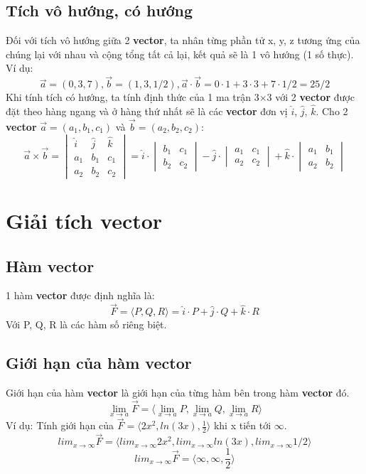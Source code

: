 \documentclass{article}
\begin{document}
\subsection{Tích vô hướng, có hướng}
Đối với tích vô hướng giữa 2 \textbf{vector}, ta nhân từng phần tử x, y, z tương ứng của chúng lại với nhau và cộng tổng tất cả lại, kết quả sẽ là 1 vô hướng (1 số thực).\newline
Ví dụ: 
\[\vec{a}=(0,3,7), \vec{b}=(1,3, 1/2),\vec{a}\cdot\vec{b}=0\cdot1+3\cdot3+7\cdot1/2=25/2\]
Khi tính tích có hướng, ta tính định thức của 1 ma trận 3$\times$3 với 2 \textbf{vector} được đặt theo hàng ngang và ở hàng thứ nhất sẽ là các \textbf{vector} đơn vị $\hat{i}$, $\hat{j}$, $\hat{k}$.
Cho 2 \textbf{vector} $\vec{a}=(a_1, b_1, c_1)$ và $\vec{b}=(a_2, b_2, c_2)$: 
\[\vec{a}\times\vec{b}= \begin{vmatrix}
    \hat{i}&\hat{j}&\hat{k}\\
    a_1&b_1&c_1\\
    a_2&b_2&c_2
\end{vmatrix}=\hat{i}\cdot\begin{vmatrix}
    b_1&c_1\\
    b_2&c_2
\end{vmatrix}-\hat{j}\cdot\begin{vmatrix}
    a_1&c_1\\
    a_2&c_2
\end{vmatrix}+\hat{k}\cdot\begin{vmatrix}
    a_1&b_1\\
    a_2&b_2
\end{vmatrix}\]

\section{Giải tích vector}
\subsection{Hàm vector}
1 hàm \textbf{vector} được định nghĩa là: 
\[\vec{F} = \langle P, Q, R \rangle=\hat{i}\cdot P+\hat{j}\cdot Q+\hat{k}\cdot R\]
Với P, Q, R là các hàm số riêng biệt.

\subsection{Giới hạn của hàm vector}
Giới hạn của hàm \textbf{vector} là giới hạn của từng hàm bên trong hàm \textbf{vector} đó.
\[\lim_{x \to a}\vec{F}= \langle \lim_{x \to a}P, \lim_{x \to a}Q,\lim_{x \to a}R \rangle\]
Ví dụ: 
Tính giới hạn của $\vec{F} = \langle 2x^2, ln(3x), \frac{1}{2} \rangle$ khi x tiến tới $\infty$.
\[lim_{x \to \infty}\vec{F}=\langle lim_{x \to \infty}2x^2, lim_{x \to \infty}ln(3x), lim_{x \to \infty}1/2 \rangle\]
\[lim_{x \to \infty}\vec{F} = \langle \infty, \infty, \frac{1}{2} \rangle\]
\end{document}
